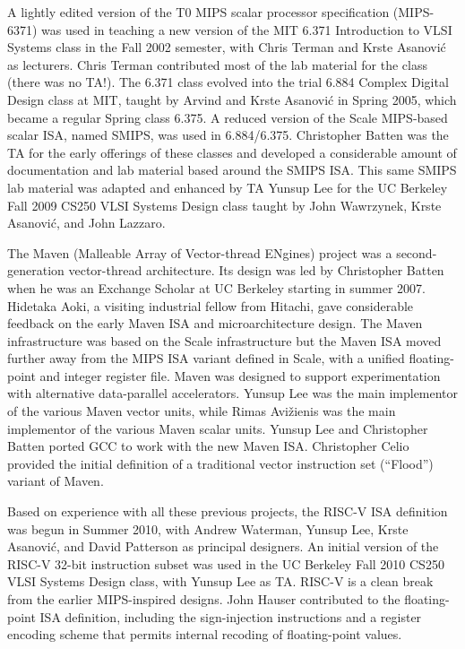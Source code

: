 A lightly edited version of the T0 MIPS scalar processor specification
(MIPS-6371) was used in teaching a new version of the MIT 6.371
Introduction to VLSI Systems class in the Fall 2002 semester, with
Chris Terman and Krste Asanovi\'{c} as lecturers.  Chris Terman
contributed most of the lab material for the class (there was no
TA!). The 6.371 class evolved into the trial 6.884 Complex Digital
Design class at MIT, taught by Arvind and Krste Asanovi\'{c} in Spring
2005, which became a regular Spring class 6.375.  A reduced version of
the Scale MIPS-based scalar ISA, named SMIPS, was used in 6.884/6.375.
Christopher Batten was the TA for the early offerings of these classes
and developed a considerable amount of documentation and lab material
based around the SMIPS ISA.  This same SMIPS lab material was adapted
and enhanced by TA Yunsup Lee for the UC Berkeley Fall 2009 CS250 VLSI
Systems Design class taught by John Wawrzynek, Krste Asanovi\'{c}, and
John Lazzaro.

The Maven (Malleable Array of Vector-thread ENgines) project was a
second-generation vector-thread architecture.  Its design was led by
Christopher Batten when he was an Exchange Scholar at UC Berkeley starting
in summer 2007.  Hidetaka Aoki, a visiting industrial fellow from
Hitachi, gave considerable feedback on the early Maven ISA and
microarchitecture design.  The Maven infrastructure was based on the
Scale infrastructure but the Maven ISA moved further away from the
MIPS ISA variant defined in Scale, with a unified floating-point and
integer register file.  Maven was designed to support experimentation
with alternative data-parallel accelerators.  Yunsup Lee was the main
implementor of the various Maven vector units, while Rimas Avi\v{z}ienis
was the main implementor of the various Maven scalar units.
Yunsup Lee and Christopher Batten ported GCC to work with the new
Maven ISA.  Christopher Celio provided the initial definition of a
traditional vector instruction set (``Flood'') variant of Maven.

Based on experience with all these previous projects, the RISC-V ISA
definition was begun in Summer 2010, with Andrew Waterman, Yunsup Lee,
Krste Asanovi\'{c}, and David Patterson as principal designers.
An initial version of the RISC-V
32-bit instruction subset was used in the UC Berkeley Fall 2010 CS250
VLSI Systems Design class, with Yunsup Lee as TA.  RISC-V is a clean
break from the earlier MIPS-inspired designs.  John Hauser contributed
to the floating-point ISA definition, including the sign-injection
instructions and a register encoding scheme that permits
internal recoding of floating-point values.

